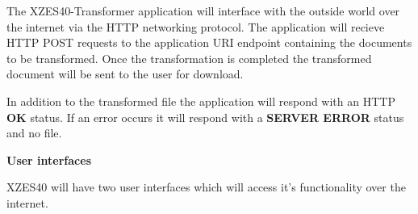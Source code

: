 The XZES40-Transformer application will interface with the outside world over the internet via the HTTP networking protocol.
The application will recieve HTTP POST requests to the application URI endpoint containing the documents to be transformed.
Once the transformation is completed the transformed document will be sent to the user for download.

In addition to the transformed file the application will respond with an HTTP \textbf{OK} status.
If an error occurs it will respond with a \textbf{SERVER ERROR} status and no file.

%

\textbf{User interfaces}

XZES40 will have two user interfaces which will access it's functionality over the internet.


